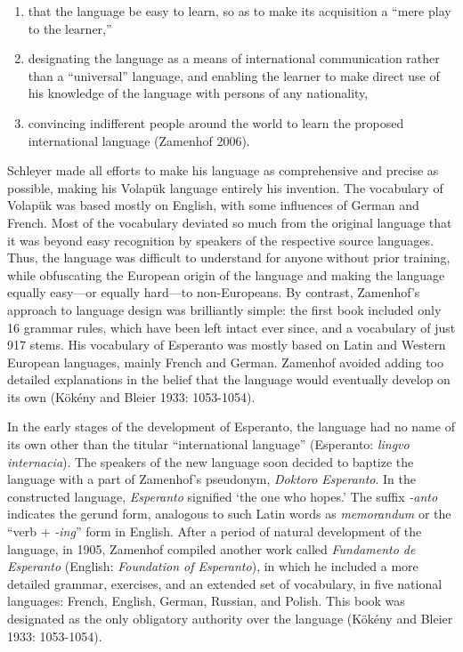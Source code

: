 \begin{enumerate}
  \item that the language be easy to learn, so as to make its acquisition a ``mere play to the learner,''
  \item designating the language as a means of international communication rather than a ``universal'' language, and enabling the learner to make direct use of his knowledge of the language with persons of any nationality,
  \item convincing indifferent people around the world to learn the proposed international language (Zamenhof 2006).
\end{enumerate}

Schleyer made all efforts to make his language as comprehensive and precise as possible, making his Volapük language entirely his invention.
The vocabulary of Volapük was based mostly on English, with some influences of German and French.
Most of the vocabulary deviated so much from the original language that it was beyond easy recognition by speakers of the respective source languages.
Thus, the language was difficult to understand for anyone without prior training, while obfuscating the European origin of the language and making the language equally easy---or equally hard---to non-Europeans.
By contrast, Zamenhof's approach to language design was brilliantly simple: the first book included only 16 grammar rules, which have been left intact ever since, and a vocabulary of just 917 stems.
His vocabulary of Esperanto was mostly based on Latin and Western European languages, mainly French and German.
Zamenhof avoided adding too detailed explanations in the belief that the language would eventually develop on its own
(Kökény and Bleier 1933: 1053-1054).

In the early stages of the development of Esperanto, the language had no name of its own other than the titular ``international language'' (Esperanto: \textit{lingvo internacia}).
The speakers of the new language soon decided to baptize the language with a part of Zamenhof's pseudonym, \textit{Doktoro Esperanto}.
In the constructed language, \textit{Esperanto} signified `the one who hopes.' The suffix \textit{-anto} indicates the gerund form, analogous to such Latin words as \textit{memorandum} or the ``verb + \textit{-ing}'' form in English.
After a period of natural development of the language, in 1905, Zamenhof compiled another work called \textit{Fundamento de Esperanto} (English: \textit{Foundation of Esperanto}), in which he included a more detailed grammar, exercises, and an extended set of vocabulary, in five national languages: French, English, German, Russian, and Polish.
This book was designated as the only obligatory authority over the language
(Kökény and Bleier 1933: 1053-1054).

